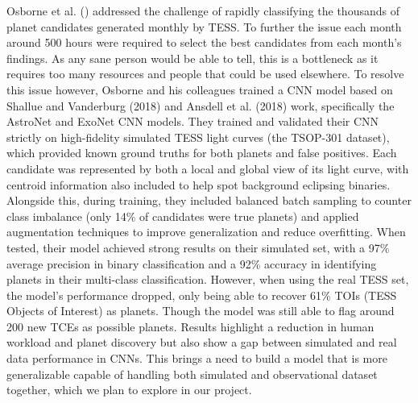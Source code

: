 \documentclass[letterpaper]{article} %
\begin{document}
Osborne et al. (\citeyear{Osborn2019rapidclassificationtesscandidates}) addressed the challenge of rapidly classifying the thousands of planet candidates generated monthly by TESS. To further the issue each month around 500 hours were required to select the best candidates from each month's findings. As any sane person would be able to tell, this is a bottleneck as it requires too many resources and people that could be used elsewhere. To resolve this issue however, Osborne and his colleagues trained a CNN model based on Shallue and Vanderburg (2018) and Ansdell et al. (2018) work, specifically the AstroNet and ExoNet CNN models. They trained and validated their CNN strictly on high-fidelity simulated TESS light curves (the TSOP-301 dataset), which provided known ground truths for both planets and false positives. Each candidate was represented by both a local and global view of its light curve, with centroid information also included to help spot background eclipsing binaries. Alongside this, during training, they included balanced batch sampling to counter class imbalance (only 14\% of candidates were true planets) and applied augmentation techniques to improve generalization and reduce overfitting. When tested, their model achieved strong results on their simulated set, with a 97\% average precision in binary classification and a 92\% accuracy in identifying planets in their multi-class classification. However, when using the real TESS set, the model's performance dropped, only being able to recover 61\% TOIs (TESS Objects of Interest) as planets. Though the model was still able to flag around 200 new TCEs as possible planets. Results highlight a reduction in human workload and planet discovery but also show a gap between simulated and real data performance in CNNs. This brings a need to build a model that is more generalizable capable of handling both simulated and observational dataset together, which we plan to explore in our project.
\end{document}
